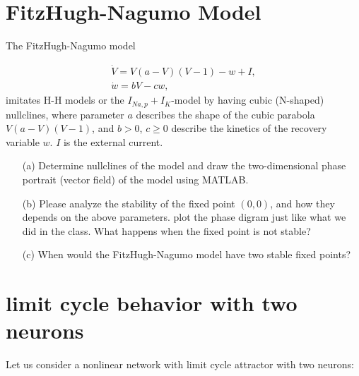 \documentclass{article}
\begin{document}
\section*{FitzHugh-Nagumo Model}

The FitzHugh-Nagumo model 

\begin{eqnarray}
\dot{V} = V(a-V)(V-1) - w +I,\\
\dot{w} = bV -cw,
\end{eqnarray}
imitates H-H models or the $I_{Na,p} + I_K$-model by having cubic (N-shaped) nullclines, where parameter $a$ describes the shape of the cubic parabola $V(a-V)(V-1)$, and $b>0$, $c\ge 0$ describe the kinetics of the recovery variable $w$. $I$ is the external current.

\begin{enumerate}

\item[(a)] Determine nullclines of the model and draw the two-dimensional phase portrait (vector field) of the model using MATLAB. 
\item[(b)] Please analyze the stability of the fixed point $(0,0)$, and how they depends on the above parameters. plot the phase digram just like what we did in the class. What happens when the fixed point is not stable? 
\item[(c)] When would the FitzHugh-Nagumo model have two stable fixed points?

\end{enumerate}

\section*{limit cycle behavior with two neurons}

Let us consider a nonlinear network with limit cycle attractor with two neurons:
\end{document}
